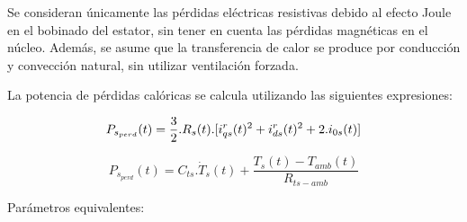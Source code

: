 \documentclass{article}
\begin{document}
    Se consideran únicamente las pérdidas eléctricas resistivas debido al efecto Joule en el bobinado del 
    estator, sin tener en cuenta las pérdidas magnéticas en el núcleo. Además, se asume que la 
    transferencia de calor se produce por conducción y convección natural, sin utilizar ventilación forzada.

    La potencia de pérdidas calóricas se calcula utilizando las siguientes expresiones:

    \begin{equation}\label{termico1}
        P_{s_{perd}}(t) =  \frac{3}{2}.R_{s}(t).[i_{qs}^r(t)^2+i_{ds}^r(t)^2+2.i_{0s}(t)]\\
    \end{equation}
    
    \begin{equation}\label{termico2}
        P_{s_{perd}}(t) = C_{ts}.\dot{T}_{s}(t) + \frac{T_{s}(t)-T_{amb}(t)}{R_{ts-amb}}
    \end{equation}

    \noindent Parámetros equivalentes:\\
\end{document}
